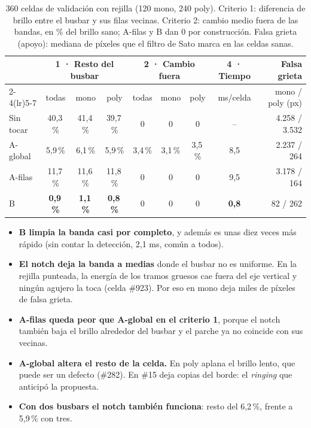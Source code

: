 \documentclass[10pt,a4paper]{article}
\begin{document}
\begin{table}[H]
\centering\small\setlength{\tabcolsep}{5pt}
\begin{tabular}{@{}l ccc ccc c r@{}}
\toprule
 & \multicolumn{3}{c}{1 · Resto del busbar} & \multicolumn{3}{c}{2 · Cambio fuera} & 4 · Tiempo & Falsa grieta \\
\cmidrule(lr){2-4}\cmidrule(lr){5-7}
 & todas & mono & poly & todas & mono & poly & ms/celda & mono / poly (px) \\
\midrule
Sin tocar & 40,3\,\% & 41,4\,\% & 39,7\,\% & 0 & 0 & 0 & – & 4.258 / 3.532 \\
A-global  & 5,9\,\%  & 6,1\,\%  & 5,9\,\%  & 3,4\,\% & 3,1\,\% & 3,5\,\% & 8,5 & 2.237 / 264 \\
A-filas   & 11,7\,\% & 11,6\,\% & 11,8\,\% & 0 & 0 & 0 & 9,5 & 3.178 / 164 \\
B         & \textbf{0,9\,\%} & \textbf{1,1\,\%} & \textbf{0,8\,\%} & 0 & 0 & 0 & \textbf{0,8} & 82 / 262 \\
\bottomrule
\end{tabular}
\caption{360 celdas de validación con rejilla (120 mono, 240 poly). Criterio 1: diferencia de brillo entre el busbar y sus filas vecinas. Criterio 2: cambio medio
fuera de las bandas, en \% del brillo sano; A-filas y B dan 0 por construcción. Falsa grieta (apoyo): mediana de píxeles que el filtro de Sato
marca en las celdas sanas.}
\end{table}

\begin{itemize}[leftmargin=14pt]
  \item \textbf{B limpia la banda casi por completo}, y además es unas diez veces más rápido (sin contar la detección, 2,1 ms, común a todos).
  \item \textbf{El notch deja la banda a medias} donde el busbar no es uniforme. En la rejilla punteada, la energía de los tramos gruesos cae fuera del eje
        vertical y ningún agujero la toca (celda \#923). Por eso en mono deja miles de píxeles de falsa grieta.
  \item \textbf{A-filas queda peor que A-global en el criterio 1}, porque el notch también baja el brillo alrededor del busbar y el parche ya no coincide con sus vecinas.
  \item \textbf{A-global altera el resto de la celda.} En poly aplana el brillo lento, que puede ser un defecto (\#282). En \#15 deja copias del borde: el \emph{ringing} que anticipó la propuesta.
  \item \textbf{Con dos busbars el notch también funciona}: resto del 6,2\,\%, frente a 5,9\,\% con tres.
\end{itemize}
\end{document}
